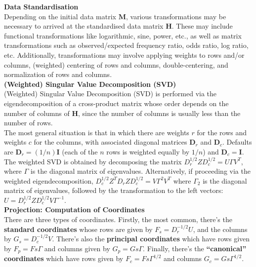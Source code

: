\documentclass{article}\usepackage[]{graphicx}\usepackage[]{xcolor}
\numberwithin{equation}{section}
\begin{document}
{\noindent \textbf{Data Standardisation}\\
Depending on the initial data matrix $\mathbf{M}$, various transformations may be necessary to arrived at the standardised data matrix $\mathbf{H}$. These may include functional transformations like logarithmic, sine, power, etc., as well as matrix transformations such as observed/expected frequency ratio, odds ratio, log ratio, etc. Additionally, transformations may involve applying weights to rows and/or columns, (weighted) centering of rows and columns, double-centering, and normalization of rows and columns.\\

\noindent \textbf {(Weighted) Singular Value Decomposition (SVD)}\\
\noindent (Weighted) Singular Value Decomposition (SVD) is performed via the eigendecomposition of a cross-product matrix whose order depends on the number of columns of $\mathbf{H}$, since the number of columns is usually less than the number of rows.\\

\noindent The most general situation is that in which there are weights $r$ for the rows and weights $c$ for the columns, with associated diagonal matrices $\mathbf{D}_r$ and $\mathbf{D}_c$. Defaults are $\mathbf{D}_r = (1/n)\mathbf{I}$ (each of the $n$ rows is weighted equally by $1/n$) and $\mathbf{D}_c = \mathbf{I}$.\\

\noindent The weighted SVD is obtained by decomposing the matrix \(D_r^{1/2} Z D_c^{1/2} = U\Gamma V^T\), where \(\Gamma\) is the diagonal matrix of eigenvalues. Alternatively, if proceeding via the weighted eigendecomposition, \(D_c^{1/2} Z^T D_r Z D_c^{1/2} = V\Gamma^2 V^T\) where \(\Gamma_2\) is the diagonal matrix of eigenvalues, followed by the transformation to the left vectors: \(U = D_r^{1/2} Z D_c^{1/2} V\Gamma^{-1}\).\\

\noindent \textbf{Projection: Computation of Coordinates}\\
\noindent There are three types of coordinates. Firstly, the most common, there's the \textbf{standard coordinates} whose rows are given by $F_s = D^{-1/2}_r U$, and the columns by $G_s = D^{-1/2}_c V$. There's also the \textbf{principal coordinates} which have rows given by $F_p = Fs\Gamma$ and columns given by $G_p = Gs\Gamma$. Finally, there's the \textbf{“canonical” coordinates} which have rows given by $F_c = Fs\Gamma^{1/2}$ and columns $G_c = Gs\Gamma^{1/2}$.\\

}
\end{document}
